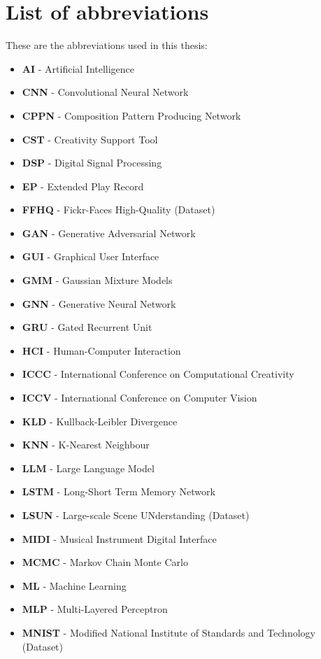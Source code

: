 \chapter*{List of abbreviations}

These are the abbreviations used in this thesis: 
\begin{itemize}
\item \textbf{AI} - Artificial Intelligence
\item \textbf{CNN} - Convolutional Neural Network
\item \textbf{CPPN} - Composition Pattern Producing Network
\item \textbf{CST} - Creativity Support Tool
\item \textbf{DSP} - Digital Signal Processing
\item \textbf{EP} - Extended Play Record
\item \textbf{FFHQ} - Fickr-Faces High-Quality (Dataset)
\item \textbf{GAN} - Generative Adversarial Network
\item \textbf{GUI} - Graphical User Interface
\item \textbf{GMM} - Gaussian Mixture Models
\item \textbf{GNN} - Generative Neural Network
\item \textbf{GRU} - Gated Recurrent Unit
\item \textbf{HCI} - Human-Computer Interaction
\item \textbf{ICCC} - International Conference on Computational Creativity
\item \textbf{ICCV} - International Conference on Computer Vision
\item \textbf{KLD} - Kullback-Leibler Divergence
\item \textbf{KNN} - K-Nearest Neighbour
\item \textbf{LLM} - Large Language Model
\item \textbf{LSTM} - Long-Short Term Memory Network
\item \textbf{LSUN} - Large-scale Scene UNderstanding (Dataset)
\item \textbf{MIDI} - Musical Instrument Digital Interface
\item \textbf{MCMC} - Markov Chain Monte Carlo
\item \textbf{ML} - Machine Learning
\item \textbf{MLP} - Multi-Layered Perceptron
\item \textbf{MNIST} - Modified National Institute of Standards and Technology (Dataset)

\end{itemize}
